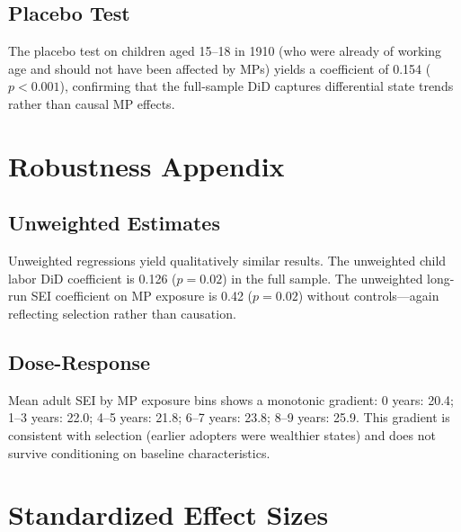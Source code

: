 \documentclass[12pt]{article}
\begin{document}
\subsection{Placebo Test}

The placebo test on children aged 15--18 in 1910 (who were already of working age and should not have been affected by MPs) yields a coefficient of 0.154 ($p < 0.001$), confirming that the full-sample DiD captures differential state trends rather than causal MP effects.

\section{Robustness Appendix}

\subsection{Unweighted Estimates}

Unweighted regressions yield qualitatively similar results. The unweighted child labor DiD coefficient is 0.126 ($p = 0.02$) in the full sample. The unweighted long-run SEI coefficient on MP exposure is 0.42 ($p = 0.02$) without controls---again reflecting selection rather than causation.

\subsection{Dose-Response}

Mean adult SEI by MP exposure bins shows a monotonic gradient: 0 years: 20.4; 1--3 years: 22.0; 4--5 years: 21.8; 6--7 years: 23.8; 8--9 years: 25.9. This gradient is consistent with selection (earlier adopters were wealthier states) and does not survive conditioning on baseline characteristics.

\section{Standardized Effect Sizes}
\label{sec:sde}

{\small

}
\end{document}
